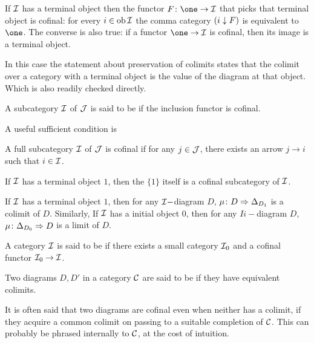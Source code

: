 \begin{exam}
If ${\cal I}$ has a terminal object then the functor $F\colon\one \to \Ii$ that picks that terminal object is cofinal: for every $i \in \operatorname{ob}{\cal I}$ the comma category $(i\downarrow F)$ is equivalent to $\one$. The converse is also true: if a functor $\one\to\Ii$ is cofinal, then its image is a terminal object.

In this case the statement about preservation of colimits states that the colimit over a category with a terminal object is the value of the diagram at that object. Which is also readily checked directly.
\end{exam}

\begin{defn}
  A subcategory ${\cal I}$ of ${\cal J}$ is said to be  if the inclusion functor is cofinal.
\end{defn}
A useful sufficient condition is
\begin{prop}\label{prop:cofinal subcategory}
  A full subcategory ${\cal I}$ of ${\cal J}$ is cofinal if for any $j\in{\cal J}$, there exists an arrow $j\to i$ such that $i\in{\cal I}$.
\end{prop}
\begin{cor}
  If ${\cal I}$ has a terminal object $1$, then the $\{1\}$ itself is a cofinal subcategory of ${\cal I}$.
\end{cor}
\begin{cor}
  If ${\cal I}$ has a terminal object $1$, then for any ${\cal I}-$diagram $D$, $\mu\colon D\Rightarrow \Delta_{D_1}$ is a colimit of $D$.
  Similarly, If ${\cal I}$ has a initial object $0$, then for any $Ii-$diagram $D$, $\mu\colon\Delta_{D_0}\Rightarrow D$ is a limit of $D$.
\end{cor}

\begin{defn}
  A category ${\cal I}$ is said to be  if there exists a small category ${\cal I}_0$ and a cofinal functor ${\cal I}_0\to{\cal I}$.
\end{defn}

\begin{defn}
  Two diagrams $D,D'$ in a category ${\cal C}$ are said to be  if they have equivalent colimits.
\end{defn}
\begin{rem}
  It is often said that two diagrams are cofinal even when neither has a colimit, if they acquire a common colimit on passing to a suitable completion of ${\cal C}$. This can probably be phrased internally to ${\cal C}$, at the cost of intuition.
\end{rem}

